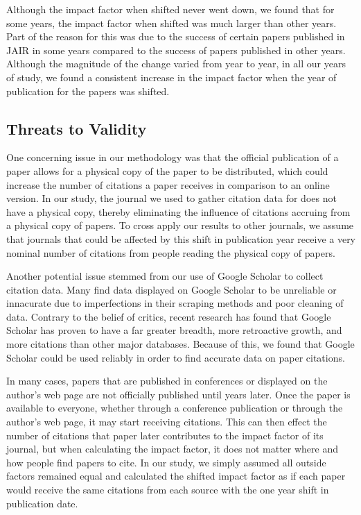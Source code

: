 \documentclass[jair,twoside,11pt,theapa]{article}
\begin{document}
Although the impact factor when shifted never went down, we found that for some years, the impact factor when shifted was much larger than other years. Part of the reason for this was due to the success of certain papers published in JAIR in some years compared to the success of papers published in other years. Although the magnitude of the change varied from year to year, in all our years of study, we found a consistent increase in the impact factor when the year of publication for the papers was shifted.

\subsection{Threats to Validity}
One concerning issue in our methodology was that the official publication of a paper allows for a physical copy of the paper to be distributed, which could increase the number of citations a paper receives in comparison to an online version. In our study, the journal we used to gather citation data for does not have a physical copy, thereby eliminating the influence of citations accruing from a physical copy of papers. To cross apply our results to other journals, we assume that journals that could be affected by this shift in publication year receive a very nominal number of citations from people reading the physical copy of papers.   

Another potential issue stemmed from our use of Google Scholar to collect citation data. Many find data displayed on Google Scholar to be unreliable or innacurate due to imperfections in their scraping methods and poor cleaning of data. Contrary to the belief of critics, recent research has found that Google Scholar has proven to have a far greater breadth, more retroactive growth, and more citations than other major databases. Because of this, we found that Google Scholar could be used reliably in order to find accurate data on paper citations. 



In many cases, papers that are published in conferences or displayed on the author's web page are not officially published until years later. Once the paper is available to everyone, whether through a conference publication or through the author's web page, it may start receiving citations. This can then effect the number of citations that paper later contributes to the impact factor of its journal, but when calculating the impact factor, it does not matter where and how people find papers to cite. In our study, we simply assumed all outside factors remained equal and calculated the shifted impact factor as if each paper would receive the same citations from each source with the one year shift in publication date. 
\end{document}
